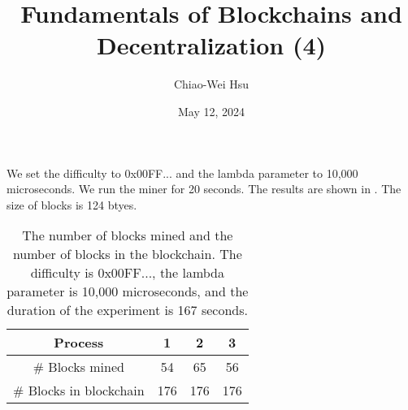 \documentclass[11pt]{article}
\begin{document}
\title{\vspace{-5cm}\Large Fundamentals of Blockchains and Decentralization (4)}
\author{Chiao-Wei Hsu}
\date{May 12, 2024}
\maketitle



We set the difficulty to 0x00FF... and the lambda parameter to 10,000 microseconds. We run the miner for 20 seconds. The results are shown in . The size of blocks is 124 btyes.



\begin{table}[hb]
    \centering
    \begin{tabular}{|c|c|c|c|}
        \hline
        Process & 1 & 2 & 3 \\
        \hline
        \# Blocks mined & 54 & 65 & 56 \\
        \# Blocks in blockchain & 176 & 176 & 176 \\
        \hline
    \end{tabular}
    \caption{The number of blocks mined and the number of blocks in the blockchain. The difficulty is 0x00FF..., the lambda parameter is 10,000 microseconds, and the duration of the experiment is 167 seconds.}
    \label{tab:blocks}
\end{table}

\end{document}
